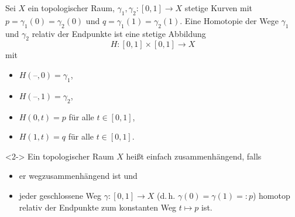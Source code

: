 \documentclass{beamer}
\renewcommand{\emph}[1]{\textcolor{Emph}{#1}}
\newcommand{\blank}{\text{--}}
\theoremstyle{definition}
\begin{document}
\begin{frame}
  \begin{definition}
    Sei $X$ ein topologischer Raum, $\gamma_1, \gamma_2 : \left[ 0, 1 \right] \to X$ stetige Kurven mit $p = \gamma_1(0) = \gamma_2(0)$ und $q = \gamma_1(1) = \gamma_2(1)$. Eine \emph{Homotopie} der Wege $\gamma_1$ und $\gamma_2$ relativ der Endpunkte ist eine stetige Abbildung
    \[ H : \left[0,1\right] \times \left[0,1\right] \to X \]
    mit
    \begin{itemize}
      \item $H(\blank, 0) = \gamma_1$,
      \item $H(\blank, 1) = \gamma_2$,
      \item $H(0, t) = p$ für alle $t \in \left[0,1\right]$,
      \item $H(1, t) = q$ für alle $t \in \left[0,1\right]$.
    \end{itemize}
  \end{definition}

  \begin{definition}<2->
    Ein topologischer Raum $X$ heißt \emph{einfach zusammenhängend}, falls
    \begin{itemize}
      \item er wegzusammenhängend ist und
      \item jeder geschlossene Weg $\gamma : \left[0,1\right] \to X$ (d.\,h. $\gamma(0) = \gamma(1) =: p$) homotop relativ der Endpunkte zum konstanten Weg $t \mapsto p$ ist.
    \end{itemize}
  \end{definition}
\end{frame}
\end{document}
